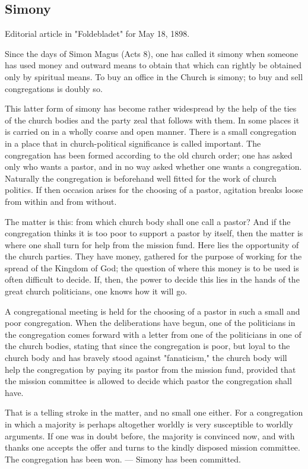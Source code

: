 
\subsection{Simony}

Editorial article in "Foldebladet" for May 18, 1898.

Since the days of Simon Magus (Acts 8), one has called it simony when someone has used money and outward means to obtain that which can rightly be obtained only by spiritual means. To buy an office in the Church is simony; to buy and sell congregations is doubly so.

This latter form of simony has become rather widespread by the help of the ties of the church bodies and the party zeal that follows with them. In some places it is carried on in a wholly coarse and open manner. There is a small congregation in a place that in church-political significance is called important. The congregation has been formed according to the old church order; one has asked only who wants a pastor, and in no way asked whether one wants a congregation. Naturally the congregation is beforehand well fitted for the work of church politics. If then occasion arises for the choosing of a pastor, agitation breaks loose from within and from without.

The matter is this: from which church body shall one call a pastor? And if the congregation thinks it is too poor to support a pastor by itself, then the matter is where one shall turn for help from the mission fund. Here lies the opportunity of the church parties. They have money, gathered for the purpose of working for the spread of the Kingdom of God; the question of where this money is to be used is often difficult to decide. If, then, the power to decide this lies in the hands of the great church politicians, one knows how it will go.

A congregational meeting is held for the choosing of a pastor in such a small and poor congregation. When the deliberations have begun, one of the politicians in the congregation comes forward with a letter from one of the politicians in one of the church bodies, stating that since the congregation is poor, but loyal to the church body and has bravely stood against "fanaticism," the church body will help the congregation by paying its pastor from the mission fund, provided that the mission committee is allowed to decide which pastor the congregation shall have.

That is a telling stroke in the matter, and no small one either. For a congregation in which a majority is perhaps altogether worldly is very susceptible to worldly arguments. If one was in doubt before, the majority is convinced now, and with thanks one accepts the offer and turns to the kindly disposed mission committee. The congregation has been won. — Simony has been committed.

